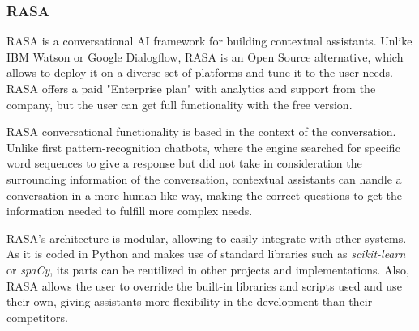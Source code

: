 \subsubsection{RASA}
RASA is a conversational AI framework for building contextual assistants. Unlike IBM Watson or Google Dialogflow, RASA is an Open Source alternative, which allows to deploy it on a diverse set of platforms and tune it to the user needs. RASA offers a paid "Enterprise plan" with analytics and support from the company, but the user can get full functionality with the free version.

RASA conversational functionality is based in the context of the conversation. Unlike first pattern-recognition chatbots, where the engine searched for specific word sequences to give a response but did not take in consideration the surrounding information of the conversation, contextual assistants can handle a conversation in a more human-like way, making the correct questions to get the information needed to fulfill more complex needs. 

RASA's architecture is modular, allowing to easily integrate with other systems. As it is coded in Python and makes use of standard libraries such as \textsl{scikit-learn} or \textsl{spaCy}, its parts can be reutilized in other projects and implementations. Also, RASA allows the user to override the built-in libraries and scripts used and use their own, giving assistants more flexibility in the development than their competitors.

